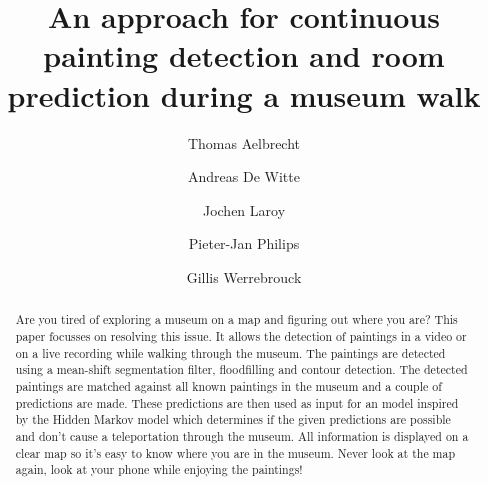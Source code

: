 \documentclass[runningheads]{llncs}
\begin{document}
\title{An approach for continuous painting detection and room prediction during a museum walk}
%
%
\author{
    Thomas Aelbrecht \and
    Andreas De Witte \and
    Jochen Laroy \and
    Pieter-Jan Philips \and
    Gillis Werrebrouck
}


%
%
\maketitle              %
%
\begin{abstract}

Are you tired of exploring a museum on a map and figuring out where you are? This paper focusses on resolving this issue. It allows the detection of paintings in a video or on a live recording while walking through the museum. The paintings are detected using a mean-shift segmentation filter, floodfilling and contour detection. The detected paintings are matched against all known paintings in the museum and a couple of predictions are made. These predictions are then used as input for an model inspired by the Hidden Markov model which determines if the given predictions are possible and don't cause a teleportation through the museum. All information is displayed on a clear map so it's easy to know where you are in the museum. Never look at the map again, look at your phone while enjoying the paintings!

\end{abstract}
%








%
%
%


\end{document}
